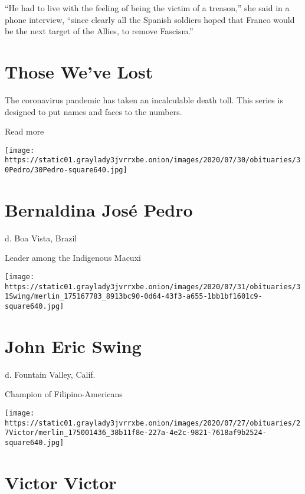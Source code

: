 ``He had to live with the feeling of being the victim of a treason,''
she said in a phone interview, ``since clearly all the Spanish soldiers
hoped that Franco would be the next target of the Allies, to remove
Fascism.''

\href{https://www.nytimes3xbfgragh.onion/interactive/2020/obituaries/people-died-coronavirus-obituaries.html?action=click\&pgtype=Article\&state=default\&region=BELOW_MAIN_CONTENT\&context=covid_obits_promo}{}

\hypertarget{those-weve-lost}{%
\section{Those We've Lost}\label{those-weve-lost}}

The coronavirus pandemic has taken an incalculable death toll. This
series is designed to put names and faces to the numbers.

Read more

\texttt{[image: https://static01.graylady3jvrrxbe.onion/images/2020/07/30/obituaries/30Pedro/30Pedro-square640.jpg]}

\hypertarget{bernaldina-josuxe9-pedro}{%
\section{Bernaldina José Pedro}\label{bernaldina-josuxe9-pedro}}

d. Boa Vista, Brazil

Leader among the Indigenous Macuxi

\texttt{[image: https://static01.graylady3jvrrxbe.onion/images/2020/07/31/obituaries/31Swing/merlin\_175167783\_8913bc90-0d64-43f3-a655-1bb1bf1601c9-square640.jpg]}

\hypertarget{john-eric-swing}{%
\section{John Eric Swing}\label{john-eric-swing}}

d. Fountain Valley, Calif.

Champion of Filipino-Americans

\texttt{[image: https://static01.graylady3jvrrxbe.onion/images/2020/07/27/obituaries/27Victor/merlin\_175001436\_38b11f8e-227a-4e2c-9821-7618af9b2524-square640.jpg]}

\hypertarget{victor-victor}{%
\section{Victor Victor}\label{victor-victor}}

